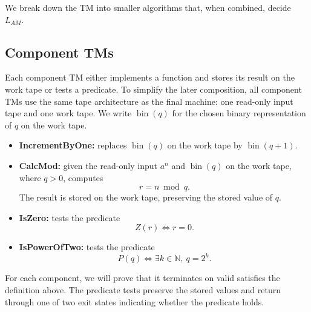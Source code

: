 \documentclass[UTF8]{article}
\begin{document}
We break down the TM into smaller algorithms that, when combined, decide $L_{AM}$.

\subsection{Component TMs}
Each component TM either implements a function and stores its result on the work tape or tests a predicate. 
To simplify the later composition, all component TMs use the same tape architecture as the final machine: one read-only input tape and one work tape.
We write $\operatorname{bin}(q)$ for the chosen binary representation of $q$ on the work tape.

\begin{itemize}
  \item \textbf{IncrementByOne:}
    replaces $\operatorname{bin}(q)$ on the work tape
    by $\operatorname{bin}(q+1)$.

  \item \textbf{CalcMod:}
    given the read-only input $a^n$ and
    $\operatorname{bin}(q)$ on the work tape, where $q>0$,
    computes
    \[
      r = n \bmod q.
    \]
    The result is stored on the work tape,
    preserving the stored value of $q$.

  \item \textbf{IsZero:}
    tests the predicate
    \[
      Z(r) \iff r=0.
    \]

  \item \textbf{IsPowerOfTwo:}
    tests the predicate
    \[
      P(q) \iff \exists k \in \mathbb{N},\ q=2^k.
    \]
\end{itemize}

For each component, we will prove that it terminates on valid satisfies
the definition above.
The predicate tests preserve the stored values and return through
one of two exit states indicating whether the predicate holds.



\end{document}

